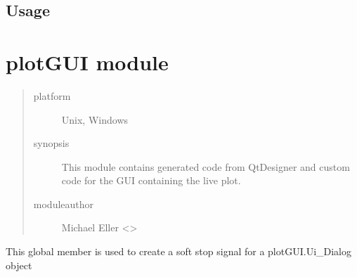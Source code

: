 \documentclass[letterpaper,10pt,english]{sphinxmanual}
\begin{document}
\subsection{Usage}
\label{\detokenize{mainWindow:usage}}
\begin{sphinxVerbatim}[commandchars=\\\{\}]
 
   
   

  
  
  
\end{sphinxVerbatim}


\section{plotGUI module}
\label{\detokenize{plotGUI:module-plotGUI}}\label{\detokenize{plotGUI:plotgui-module}}\label{\detokenize{plotGUI::doc}}\begin{quote}\begin{description}
\item[{platform}] \leavevmode
Unix, Windows

\item[{synopsis}] \leavevmode
This module contains generated code from QtDesigner and custom code for the GUI containing the live plot.

\item[{moduleauthor}] \leavevmode
Michael Eller \textless{}\textgreater{}

\end{description}\end{quote}

\begin{fulllineitems}
\label{\detokenize{plotGUI:plotGUI.stop}}
This global member is used to create a soft stop signal for a plotGUI.Ui\_Dialog object

\end{fulllineitems}
\end{document}
